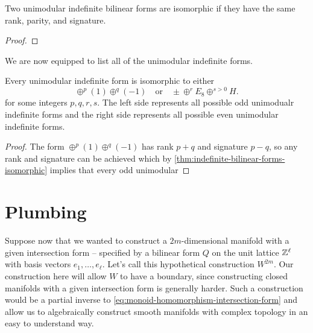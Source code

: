 \begin{theorem}\label{thm:indefinite-bilinear-forms-isomorphic}
	Two unimodular indefinite bilinear forms are isomorphic if they have the same rank, parity, and signature.
\end{theorem}
\begin{proof}
\end{proof}

We are now equipped to list all of the unimodular indefinite forms. 
\begin{proposition}
	Every unimodular indefinite form is isomorphic to either
\[
	\oplus^p (1)\oplus^q (-1)
	\quad\textrm{or}\quad
	\pm \oplus^r E_8 \oplus^{s>0} H.
\]
for some integers $p,q,r,s$. The left side represents all possible odd unimodualr indefinite forms and the right side represents all possible even unimodular indefinite forms.
\end{proposition}
\begin{proof}
	The form $\oplus^p (1)\oplus^q(-1)$ has rank $p+q$ and signature $p-q$, so any rank and signature can be achieved which by \cref{thm:indefinite-bilinear-forms-isomorphic} implies that every odd unimodular 
\end{proof}

\section{Plumbing}\label{sec:plumbing}

Suppose now that we wanted to construct a $2m$-dimensional manifold with a given intersection form -- specified by a bilinear form $Q$ on the unit lattice $\mathbb{Z}^\ell$ with basis vectors $e_1,\ldots, e_\ell$. Let's call this hypothetical construction $W^{2m}$. Our construction here will allow $W$ to have a boundary, since constructing closed manifolds with a given intersection form is generally harder.
Such a construction would be a partial inverse to \cref{eq:monoid-homomorphism-intersection-form} and allow us to algebraically construct smooth manifolds with complex topology in an easy to understand way.

